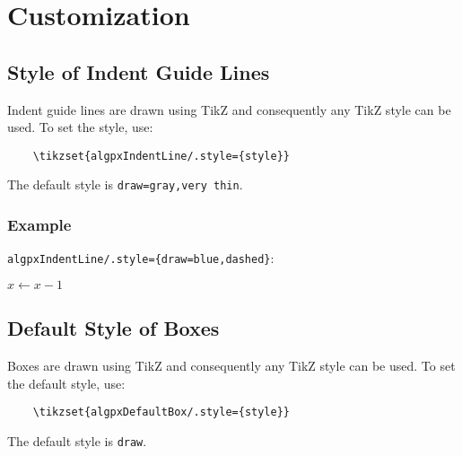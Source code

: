 \documentclass[11pt,a4paper,USenglish]{article}
\begin{document}
\section{Customization}
\subsection{Style of Indent Guide Lines}\label{sec:indStyle}
Indent guide lines are drawn using TikZ and consequently any TikZ style can be used. To set the style, use:
\begin{verbatim}
	\tikzset{algpxIndentLine/.style={style}}
\end{verbatim}
The default style is \verb|draw=gray,very thin|.

\subsubsection*{Example}
\verb|algpxIndentLine/.style={draw=blue,dashed}|:
\begin{algorithmic}
		\State $x \gets x - 1$
	\EndIf
\end{algorithmic}


\subsection{Default Style of Boxes}\label{sec:defBoxStyle}
Boxes are drawn using TikZ and consequently any TikZ style can be used. To set the default style, use:
\begin{verbatim}
	\tikzset{algpxDefaultBox/.style={style}}
\end{verbatim}
The default style is \verb|draw|.
\end{document}
